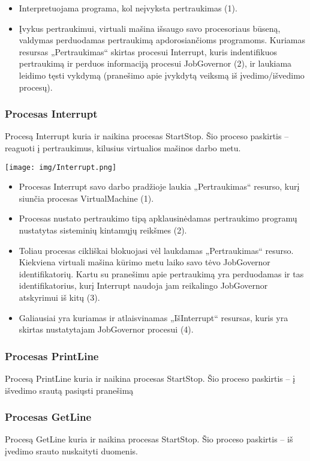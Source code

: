 	\begin{itemize}
		\item Interpretuojama programa, kol neįvyksta pertraukimas (1).
		\item Įvykus pertraukimui, virtuali mašina išsaugo savo procesoriaus būseną, valdymas perduodamas pertraukimą apdorosiančioms programoms. Kuriamas resursas „Pertraukimas“ skirtas procesui Interrupt, kuris indentifikuos pertraukimą ir perduos informaciją procesui JobGovernor (2), ir laukiama leidimo tęsti vykdymą (pranešimo apie įvykdytą veiksmą iš įvedimo/išvedimo procesų).
	\end{itemize}
\subsubsection{Procesas Interrupt}
Procesą Interrupt kuria ir naikina procesas StartStop. Šio proceso paskirtis – reaguoti į pertraukimus, kilusius virtualios mašinos darbo metu. 

\texttt{[image: img/Interrupt.png]}

	\begin{itemize}
		\item Procesas Interrupt savo darbo pradžioje laukia „Pertraukimas“ resurso, kurį siunčia procesas VirtualMachine (1).
		\item  Procesas nustato pertraukimo tipą apklausinėdamas pertraukimo programų nustatytas sisteminių kintamųjų reikšmes (2).
		\item Toliau procesas cikliškai blokuojasi vėl laukdamas „Pertraukimas“ resurso. Kiekviena virtuali mašina kūrimo metu laiko savo tėvo JobGovernor identifikatorių. Kartu su pranešimu apie pertraukimą yra perduodamas ir tas identifikatorius, kurį Interrupt naudoja jam reikalingo JobGovernor atskyrimui iš kitų (3).
		\item Galiausiai yra kuriamas ir atlaisvinamas „IšInterrupt“ resursas, kuris yra skirtas nustatytajam JobGovernor procesui (4). 
	\end{itemize}
\subsubsection{Procesas PrintLine}
Procesą PrintLine kuria ir naikina procesas StartStop. Šio proceso paskirtis – į išvedimo srautą pasiųsti pranešimą
	
\subsubsection{Procesas GetLine}
Procesą GetLine kuria ir naikina procesas StartStop. Šio proceso paskirtis – iš įvedimo srauto nuskaityti duomenis. 

